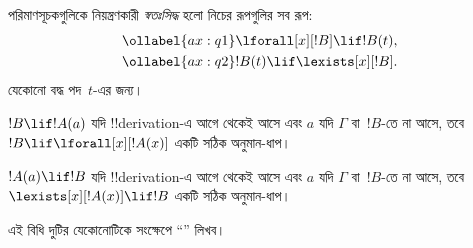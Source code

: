 \documentclass[../../../include/open-logic-section]{subfiles}
\begin{document}


\begin{defn}[পরিমাণসূচকের স্বতঃসিদ্ধ]
পরিমাণসূচকগুলিকে নিয়ন্ত্রণকারী \emph{স্বতঃসিদ্ধ} হলো নিচের রূপগুলির
সব রূপ:
\begin{align}
\ollabel{ax:q1} & \lforall[x][!B] \lif !B(t), \\
\ollabel{ax:q2} & !B(t) \lif \lexists[x][!B].
\end{align}
যেকোনো বদ্ধ পদ~$t$-এর জন্য।
\end{defn}

\begin{defn}[পরিমাণসূচকের বিধি]
\item $!B \lif !A(a)$ যদি !!{derivation}-এ আগে থেকেই আসে এবং $a$ যদি
  $\Gamma$ বা~$!B$-তে না আসে, তবে $!B \lif
  \lforall[x][!A(x)]$ একটি সঠিক অনুমান-ধাপ।
\item $!A(a) \lif !B$ যদি !!{derivation}-এ আগে থেকেই আসে এবং $a$ যদি
  $\Gamma$ বা~$!B$-তে না আসে, তবে $\lexists[x][!A(x)] \lif
  !B$ একটি সঠিক অনুমান-ধাপ।
\end{defn}

এই বিধি দুটির যেকোনোটিকে সংক্ষেপে ``\QR'' লিখব।
\end{document}
